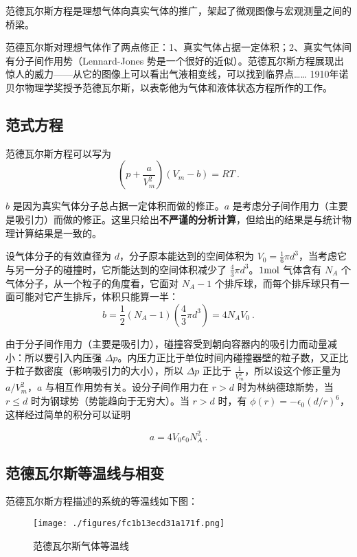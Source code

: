 
范德瓦尔斯方程是理想气体向真实气体的推广，架起了微观图像与宏观测量之间的桥梁。

范德瓦尔斯对理想气体作了两点修正：1、真实气体占据一定体积；2、真实气体间有分子间作用势（Lennard-Jones 势是一个很好的近似）。范德瓦尔斯方程展现出惊人的威力——从它的图像上可以看出气液相变线，可以找到临界点…… 1910年诺贝尔物理学奖授予范德瓦尔斯，以表彰他为气体和液体状态方程所作的工作。

\subsection{范式方程}
范德瓦尔斯方程可以写为
\begin{equation}
\left(p+\frac{a}{V_m^2}\right)(V_m-b)=RT~.
\end{equation}

$b$ 是因为真实气体分子总占据一定体积而做的修正。$a$ 是考虑分子间作用力（主要是吸引力）而做的修正。这里只给出\textbf{不严谨的分析计算}，但给出的结果是与统计物理计算结果是一致的。

设气体分子的有效直径为 $d$，分子原本能达到的空间体积为 $V_0=\frac{1}{6}\pi d^3$，当考虑它与另一分子的碰撞时，它所能达到的空间体积减少了 $\frac{4}{3}\pi d^3$。$1\rm mol$ 气体含有 $N_A$ 个气体分子，从一个粒子的角度看，它面对 $N_A-1$ 个排斥球，而每个排斥球只有一面可能对它产生排斥，体积只能算一半：
\begin{equation}
b=\frac{1}{2}(N_A-1)(\frac{4}{3}\pi d^3)=4N_A V_0~.
\end{equation}

由于分子间作用力（主要是吸引力），碰撞容受到朝向容器内的吸引力而动量减小：所以要引入内压强 $\Delta p$。内压力正比于单位时间内碰撞器壁的粒子数，又正比于粒子数密度（影响吸引力的大小），所以 $\Delta p$ 正比于 $\frac{1}{V_m^2}$，所以设这个修正量为 $a/V_m^2$，$a$ 与相互作用势有关。设分子间作用力在 $r>d$ 时为林纳德琼斯势，当 $r\le d$ 时为钢球势（势能趋向于无穷大）。当 $r>d$ 时，有 $\phi(r)=-\epsilon_0(d/r)^6$，这样经过简单的积分可以证明

\begin{equation}
a=4V_0\epsilon_0 N_A^2~.
\end{equation}

\subsection{范德瓦尔斯等温线与相变}
范德瓦尔斯方程描述的系统的等温线如下图：
\begin{figure}[ht]
\centering
\texttt{[image: ./figures/fc1b13ecd31a171f.png]}
\caption{范德瓦尔斯气体等温线} \label{fig_Vand_1}
\end{figure}

